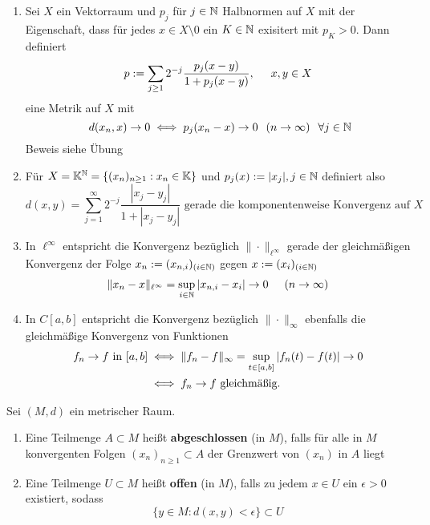 \begin{beispiel}
	\begin{enumerate}[label=\alph*\upshape)]	
		\item Sei $X$ ein Vektorraum und $p_{j}$ für $j \in \mathbb{N}$ Halbnormen auf $X$ mit der Eigenschaft, dass für jedes $x \in X \setminus {0}$ ein $K \in \mathbb{N}$ exisitert mit $p_{K} > 0$. Dann definiert
			\[ p := \sum_{j \geq 1} 2^{-j} \frac{p_{j}(x - y)}{1 + p_{j}(x -y)}, \hspace{0.5cm} x, y \in X \]
			eine Metrik auf $X$ mit
			\[ d(x_{n}, x) \rightarrow 0 \gdw p_{j}(x_{n} - x) \rightarrow 0 \hspace{0.25cm} (n \rightarrow  \infty) \hspace{0.25cm} \forall j \in \MdN \]
			Beweis siehe Übung
		\item Für $X = \mathbb{K}^{\mathbb{N}} = \{ (x_{n})_{n \geq 1}: x_{n} \in \mathbb{K} \}$ und $p_{j}(x) := |x_{j}|, j \in \mathbb{N}$ definiert also
			\[ d(x, y) = \sum_{j = 1}^{\infty} 2^{-j} \frac{|x_{j} - y_{j}|}{1 + |x_{j} - y_{j}|} \text{ gerade die komponentenweise Konvergenz auf } X \]
		\item In $\ell^{\infty}$ entspricht die Konvergenz bezüglich $\| \cdot \|_{\ell^{\infty}}$ gerade der gleichmä{\ss}igen Konvergenz der Folge $x_{n} := (x_{n, i})_{(i \in \mathbb{N})}$ gegen $x := (x_{i})_{(i \in \mathbb{N})}$
			\[ \| x_{n} - x \|_{\ell^{\infty}} = \sup_{i \in \mathbb{N}} | x_{n, i} - x_{i} | \rightarrow 0 \hspace{0.5cm} (n \rightarrow \infty) \]
		\item In $C[a, b]$ entspricht die Konvergenz bezüglich $\| \cdot \|_{\infty}$ ebenfalls die gleichmä{\ss}ige Konvergenz von Funktionen
			\begin{align*}
				f_{n} \rightarrow f \text{ in } [a, b] & \iff \| f_{n} - f \|_{\infty} = \sup_{t \in [a, b]} |f_{n}(t) - f(t) | \rightarrow 0 \\
				& \iff f_{n} \rightarrow f \text{ gleichmä{\ss}ig.}
			\end{align*}
	\end{enumerate}
\end{beispiel}

\begin{definition}   \label{def:1-4.4-abgoff}
	Sei $(M, d)$ ein metrischer Raum.
	\begin{enumerate}[label=\alph*\upshape)]
		\item Eine Teilmenge $A \subset M$ hei{\ss}t \textbf{abgeschlossen} (in $M$), falls für alle in $M$ konvergenten Folgen $(x_{n})_{n \geq 1} \subset A$ der Grenzwert von $(x_{n})$ in $A$ liegt
		\item Eine Teilmenge $U \subset M$ hei{\ss}t \textbf{offen} (in $M$), falls zu jedem $x \in U$ ein $\epsilon > 0$ existiert, sodass
			\[ \{ y \in M: d(x, y) < \epsilon \} \subset U \]
	\end{enumerate}
\end{definition}

